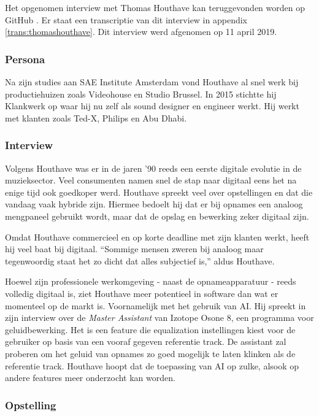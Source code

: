 Het opgenomen interview met Thomas Houthave kan teruggevonden worden op GitHub \autocite{thomashouthave}. Er staat een transcriptie van dit interview in appendix \ref{trans:thomashouthave}. Dit interview werd afgenomen op 11 april 2019.

\subsubsection*{Persona}

Na zijn studies aan SAE Institute Amsterdam vond Houthave al snel werk bij productiehuizen zoals Videohouse en Studio Brussel. In 2015 stichtte hij Klankwerk op waar hij nu zelf als sound designer en engineer werkt. Hij werkt met klanten zoals Ted-X, Philips en Abu Dhabi. \autocite{klankwerkbio}

\subsubsection*{Interview}

Volgens Houthave was er in de jaren '90 reeds een eerste digitale evolutie in de muzieksector. Veel consumenten namen snel de stap naar digitaal eens het na enige tijd ook goedkoper werd. Houthave spreekt veel over opstellingen en dat die vandaag vaak hybride zijn. Hiermee bedoelt hij dat er bij opnames een analoog mengpaneel gebruikt wordt, maar dat de opslag en bewerking zeker digitaal zijn. \autocite{thomashouthave}

Omdat Houthave commercieel en op korte deadline met zijn klanten werkt, heeft hij veel baat bij digitaal. ``Sommige mensen zweren bij analoog maar tegenwoordig staat het zo dicht dat alles subjectief is,'' aldus Houthave. \autocite{thomashouthave} 

Hoewel zijn professionele werkomgeving - naast de opnameapparatuur - reeds volledig digitaal is, ziet Houthave meer potentieel in software dan wat er momenteel op de markt is. Voornamelijk met het gebruik van AI. Hij spreekt in zijn interview over de \textit{Master Assistant} van Izotope Osone 8, een programma voor geluidbewerking. Het is een feature die equalization instellingen kiest voor de gebruiker op basis van een vooraf gegeven referentie track. De assistant zal proberen om het geluid van opnames zo goed mogelijk te laten klinken als de referentie track. Houthave hoopt dat de toepassing van AI op zulke, alsook op andere features meer onderzocht kan worden. \autocite{thomashouthave}

\subsubsection*{Opstelling}

